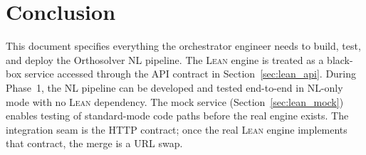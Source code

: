 \documentclass[11pt,a4paper]{article}
\newcommand{\Lean}{\textsc{Lean}}
\begin{document}
\section{Conclusion}

This document specifies everything the orchestrator engineer needs to build, test, and deploy the Orthosolver NL pipeline. The \Lean{} engine is treated as a black-box service accessed through the API contract in Section~\ref{sec:lean_api}. During Phase~1, the NL pipeline can be developed and tested end-to-end in NL-only mode with no \Lean{} dependency. The mock service (Section~\ref{sec:lean_mock}) enables testing of standard-mode code paths before the real engine exists. The integration seam is the HTTP contract; once the real \Lean{} engine implements that contract, the merge is a URL swap.
\end{document}
